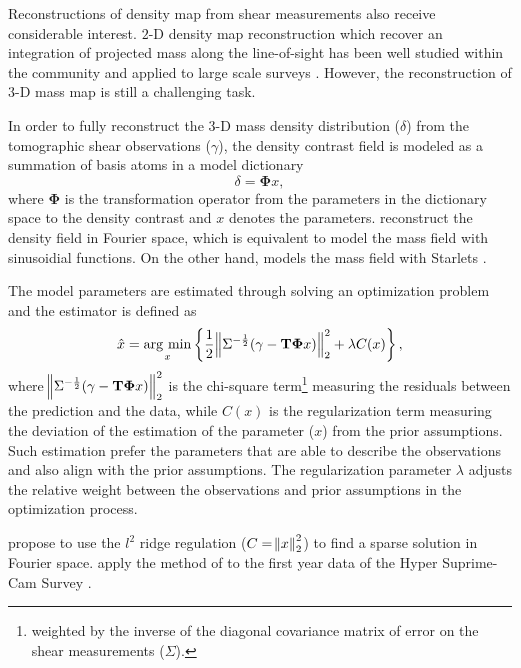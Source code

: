 \documentclass[twocolumn]{aastex62}
\newcommand{\argmin}{\mathop{\rm arg~min}\limits}
\newcommand \redColor{\color{red}}
\begin{document}
Reconstructions of density map from shear measurements also receive considerable interest. $2$-D density map reconstruction 
which recover an integration of projected mass along the line-of-sight has been well studied within the community
\citep{massMap-KS1993,WL-massMap-Glimpse2D-Lanusse2016}
and applied to large scale surveys \citep{HSC1-massMaps,massMapDES-Chang2018,DES-SV-massMap-sparsity}. However, the 
reconstruction of $3$-D mass map is still a challenging task.

In order to fully reconstruct the $3$-D mass density distribution ($\delta$) from the tomographic shear observations ($\gamma$),
the density contrast field is modeled as a summation of basis atoms in a model dictionary
\begin{equation} \label{eq-intro-dict}
 \delta= \mathbf{\Phi} x,
\end{equation}
where $\mathbf{\Phi}$ is the transformation operator from the parameters in the dictionary space to the density contrast 
and $x$ denotes the parameters. \citet{LSS-massMap-Wiener-Simon2009} reconstruct the density field
in Fourier space, which is equivalent to model the mass field with sinusoidial functions. On the other hand,
\citet{LSS-massMap-Glimpse3D-Leonard2014} models the mass field with Starlets \citep{Starlet-Starck2015}.

The model parameters are estimated through solving an optimization problem and the estimator is defined as
\begin{equation}
\hat{x}=\argmin_{x} \left\{ \frac{1}{2}\norm{\Sigma^{-\frac{1}{2}}(\gamma- \mathbf{T\Phi} x)}_2^2+ \lambda C(x) \right\},
\end{equation}
where $\norm{\Sigma^{-\frac{1}{2}}(\gamma - \mathbf{T\Phi} x)}_2^2$ is the chi-square term\footnote{weighted by the
inverse of the diagonal covariance matrix of error on the shear measurements ($\Sigma$).} measuring
the residuals between the prediction and the data, while $C(x)$ is the regularization term measuring the deviation of
the estimation of the parameter ($x$) from the prior assumptions. Such estimation prefer the parameters that are able
to describe the observations and also align with the prior assumptions. The regularization parameter $\lambda$ adjusts 
the relative weight between the observations and prior assumptions in the optimization process.

\citet{LSS-massMap-Wiener-Simon2009} propose to use the $l^2$ ridge regulation ($C=\norm{x}^2_2$) to find a sparse 
solution in Fourier space. \citet{HSC1-massMaps} apply the method of \citet{LSS-massMap-Wiener-Simon2009} to the first 
year data of the Hyper Suprime-Cam Survey \citep{HSC1-data}. 
{\redColor{Why we use $l^1$ in this paper, what is the difference between $l^1$ and $l^2$.}}
\end{document}
